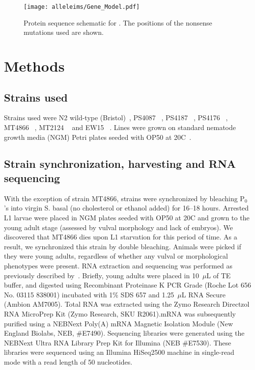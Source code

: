 \begin{figure}
  \centering{}
  \texttt{[image: alleleims/Gene\_Model.pdf]}
  \caption{
           Protein sequence schematic for . The positions of the
           nonsense mutations used are shown.
           }
\label{fig:genemodel}
\end{figure}


\section*{Methods}\label{sec:methods}

\subsection*{Strains used}
Strains used were N2 wild-type (Bristol)~\citep{Brenner1974},
PS4087 \sy{}~\citep{Moghal2003},
PS4187 \bx{}~\citep{Zhang2000},
PS4176 ~\citep{Moghal2003},
MT4866 ~\citep{Beitel1990a},
MT2124 ~\citep{Beitel1990a} and
EW15 ~\citep{Eisenmann1998}.
Lines were grown on standard nematode growth media (NGM) Petri plates seeded
with OP50 \ecol{} at 20\degree{}C~\citep{Brenner1974}.

\subsection*{Strain synchronization, harvesting and RNA sequencing}
With the exception of strain MT4866, strains were synchronized by bleaching
P$_0$'s into virgin S. basal (no cholesterol or ethanol added) for 16--18 hours.
Arrested L1 larvae were placed in NGM plates seeded with OP50 at 20\degree{}C
and grown to the young adult stage (assessed by vulval morphology and lack of
embryos). We discovered that MT4866 dies upon L1 starvation for this period of
time. As a result, we synchronized this strain by double bleaching. Animals were
picked if they were young adults, regardless of whether any vulval or
morphological phenotypes were present. RNA extraction and sequencing was
performed as previously described by~\citet{AngelesAlboresHIF,
Angeles-Albores2017}. Briefly, young adults were placed in 10~$\mu$L of TE
buffer,  and digested using  Recombinant Proteinase K PCR Grade (Roche Lot 656
No. 03115 838001) incubated with 1\% SDS 657 and 1.25~$\mu$L RNA Secure (Ambion
AM7005). Total RNA was extracted using the Zymo Research Directzol RNA MicroPrep
Kit (Zymo Research, SKU R2061).\@ mRNA was subsequently purified using a NEBNext
Poly(A) mRNA Magnetic Isolation Module (New England Biolabs, NEB, \#E7490).
Sequencing libraries were generated using the NEBNext Ultra RNA Library Prep Kit
for Illumina (NEB \#E7530). These libraries were sequenced using an Illumina
HiSeq2500 machine in single-read mode with a read length of 50 nucleotides.

